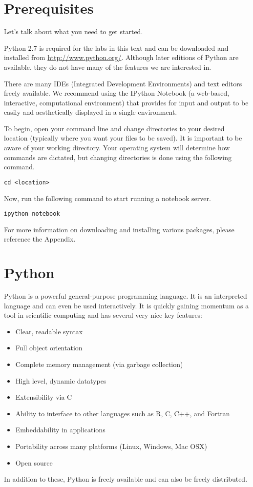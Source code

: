 \label{lab:Essential_Python}

\section*{Prerequisites}
Let's talk about what you need to get started.

Python 2.7 is required for the labs in this text and can be downloaded and 
installed from \url{http://www.python.org/}. Although later editions of 
Python are available, they do not have many of the features we are interested in. 

There are many IDEs (Integrated Development Environments) and text editors freely 
available. We recommend using the IPython Notebook (a web-based, interactive, 
computational environment) that provides for input and output to be easily 
and aesthetically displayed in a single environment. 

To begin, open your command line and change directories to your desired location 
(typically where you want your files to be saved). It is important to be aware 
of your working directory. Your operating system will determine how commands are dictated, 
but changing directories is done using the following command.
\begin{lstlisting}
cd <location>
\end{lstlisting}
Now, run the following command to start running a notebook server.
\begin{lstlisting}
ipython notebook
\end{lstlisting}

For more information on downloading and installing various packages, please 
reference the Appendix. 


\section*{Python}
Python is a powerful general-purpose programming language. It is an interpreted
language and can even be used interactively. 
It is quickly gaining momentum as a tool in scientific computing and has several 
very nice key features:
\begin{itemize}
\item Clear, readable syntax
\item Full object orientation
\item Complete memory management (via garbage collection)
\item High level, dynamic datatypes
\item Extensibility via C
\item Ability to interface to other languages such as R, C, C++, and Fortran
\item Embeddability in applications
\item Portability across many platforms (Linux, Windows, Mac OSX)
\item Open source

\end{itemize}
In addition to these, Python is freely available and can also be freely distributed.

